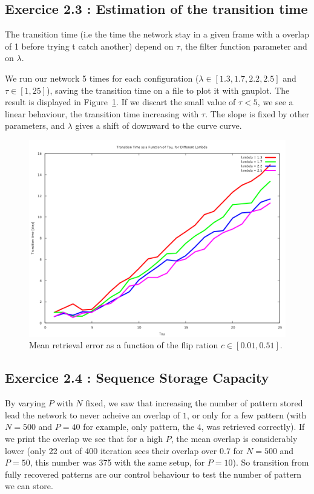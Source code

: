 \subsection{Exercice 2.3 : Estimation of the transition time}
The transition time (i.e the time the network stay in a given frame with a overlap of 1
before trying t catch another) depend on $\tau$, the filter function parameter and 
on $\lambda$.

We run our network 5 times for each configuration ($\lambda \in [1.3, 1.7, 2.2, 2.5]$ and 
$\tau \in [1, 25]$), saving the transition time on a file to plot it with gnuplot. The result
is displayed in Figure~\ref{transtime}. If we discart the small value of $\tau < 5$, we
see a linear behaviour, the transition time increasing with $\tau$. The slope is fixed by other parameters,
and $\lambda$ gives a shift of downward to the curve curve.

\begin{figure}\label{transtime}
    \begin{center}
    \caption{Mean retrieval error as a function of the flip ration $c\in[0.01, 0.51]$.  }
    \includegraphics[scale=0.5]{img/ex23.png}
    \end{center}
\end{figure}


\subsection{Exercice 2.4 : Sequence Storage Capacity}

By varying $P$ with $N$ fixed, we saw that increasing the number of pattern stored lead the network
to never acheive an overlap of $1$, or only for a few pattern (with $N = 500$ and $P = 40$ for example, only pattern, the $4$,
was retrieved correctly). If we print the overlap we see that for a high $P$, the mean overlap is considerably lower (only 22 out of 400
iteration sees their overlap over $0.7$ for $N = 500$ and $P = 50$, this number was 375 with the same setup, for $P = 10$). So transition
from fully recovered patterns are our control behaviour to test the number of pattern we can store. 

